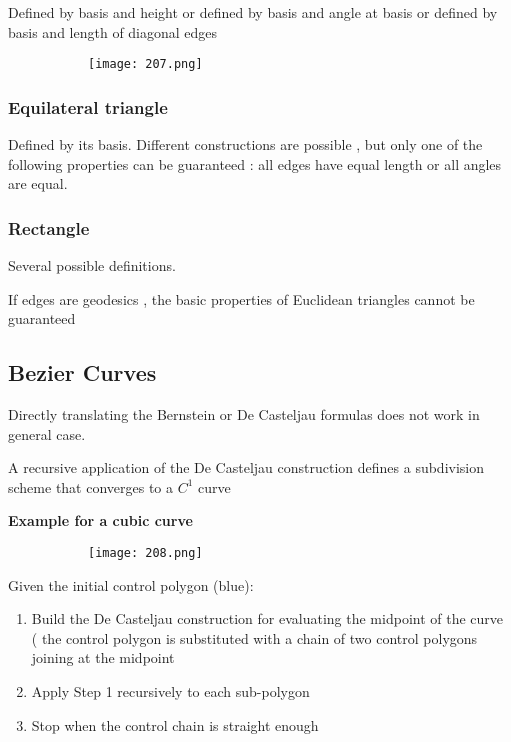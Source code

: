 \documentclass{article}
\begin{document}
Defined by basis and height or defined by basis and angle at basis or defined by basis and length of diagonal edges

\begin{figure}[ht!]
  \centering
  \begin{subfigure}[b]{0.3\linewidth}
    \texttt{[image: 207.png]}
  \end{subfigure}
\end{figure}

\subsubsection{Equilateral triangle}

Defined by its basis. Different constructions are possible , but only one of the following properties can be guaranteed : all edges have equal length or all angles are equal.

\subsubsection{Rectangle}

Several possible definitions.

If edges are geodesics , the basic properties of Euclidean triangles cannot be guaranteed

\subsection{Bezier Curves}

Directly translating the Bernstein or De Casteljau formulas does not work in general case.

A recursive application of the De Casteljau construction defines a subdivision scheme that converges to a $C^1$ curve

\textbf{Example for a cubic curve}

\begin{figure}[ht!]
  \centering
  \begin{subfigure}[b]{0.3\linewidth}
    \texttt{[image: 208.png]}
  \end{subfigure}
\end{figure}

Given the initial control polygon (blue):

\begin{enumerate}
    \item Build the De Casteljau construction for evaluating the midpoint of the curve ( the control polygon is substituted with a chain of two control polygons joining at the midpoint
    \item Apply Step 1 recursively to each sub-polygon
    \item Stop when the control chain is straight enough
\end{enumerate}
\end{document}
